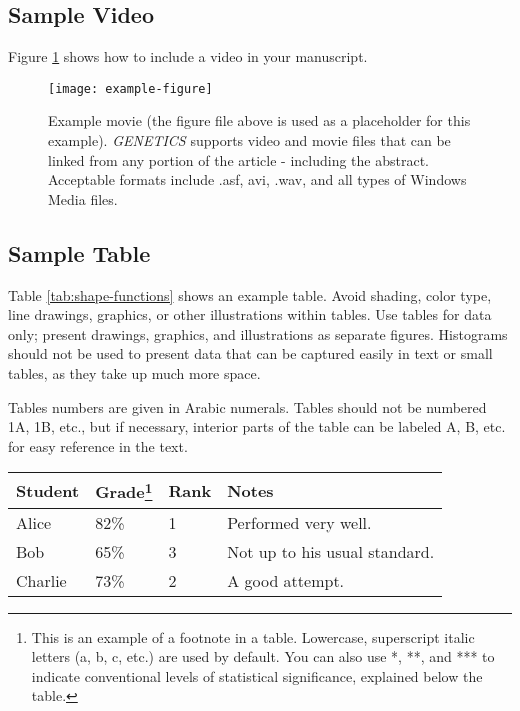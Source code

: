 \documentclass[9pt,twocolumn,twoside]{gsajnl}
\begin{document}
\subsection*{Sample Video}

Figure \ref{video:spectrum} shows how to include a video in your manuscript.

\begin{figure}[htbp]
\centering
\texttt{[image: example-figure]}
\caption{Example movie (the figure file above is used as a placeholder for this example). \textit{GENETICS} supports video and movie files that can be linked from any portion of the article - including the abstract. Acceptable formats include .asf, avi, .wav, and all types of Windows Media files.   
}%
\label{video:spectrum}
\end{figure}


\subsection*{Sample Table}

Table \ref{tab:shape-functions} shows an example table. Avoid shading, color type, line drawings, graphics, or other illustrations within tables. Use tables for data only; present drawings, graphics, and illustrations as separate figures. Histograms should not be used to present data that can be captured easily in text or small tables, as they take up much more space.  

Tables numbers are given in Arabic numerals. Tables should not be numbered 1A, 1B, etc., but if necessary, interior parts of the table can be labeled A, B, etc. for easy reference in the text.  


\begin{table*}[htbp]
\centering
\caption{\bf Students and their grades}
\begin{tableminipage}{\textwidth}
\begin{tabularx}{\textwidth}{XXXX}
\hline
Student & Grade\footnote{This is an example of a footnote in a table. Lowercase, superscript italic letters (a, b, c, etc.) are used by default. You can also use *, **, and *** to indicate conventional levels of statistical significance, explained below the table.} & Rank & Notes \\
\hline
Alice & 82\% & 1 & Performed very well.\\
Bob & 65\% & 3 & Not up to his usual standard.\\
Charlie & 73\% & 2 & A good attempt.\\
\hline
\end{tabularx}
  \label{tab:shape-functions}
\end{tableminipage}
\end{table*}
\end{document}
